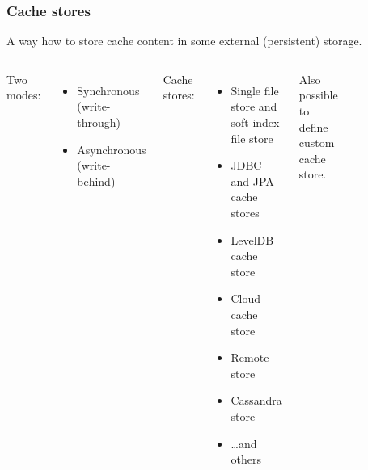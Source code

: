 \documentclass[10pt,utf8]{beamer}
\begin{document}
\begin{frame}
	\frametitle{Cache stores}
	A way how to store cache content in some external (persistent) storage.\\

	\begin{columns}
	 {
		Two modes:
		\begin{itemize}
			\item Synchronous (write-through)
			\item Asynchronous (write-behind)
		\end{itemize}
	}
	 {
		Cache stores:
		\begin{itemize}
			\item Single file store and soft-index file store
			\item JDBC and JPA cache stores
			\item LevelDB cache store
			\item Cloud cache store
			\item Remote store
			\item Cassandra store
			\item \dots and others
		\end{itemize}
		Also possible to define custom cache store.
	}
		\begin{figure}
			\includegraphics[width=3cm]{./img/cache_store.eps}
		\end{figure}
	\end{columns}
\end{frame}
\end{document}
